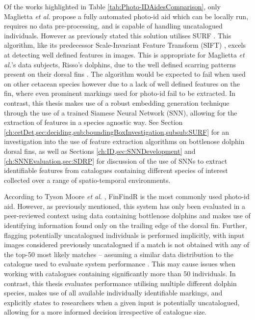 Of the works highlighted in Table \ref{tab:Photo-IDAidesComparison}, only Maglietta \textit{et al.} propose a fully automated photo-id aid which can be locally run, requires no data pre-processing, and is capable of handling uncatalogued individuals. However as previously stated this solution utilises SURF \cite{bay_speeded-up_2008}. This algorithm, like its predecessor Scale-Invariant Feature Transform (SIFT) \cite{lowe_object_1999}, excels at detecting well defined features in images. This is appropriate for Maglietta \textit{et al.}'s data subjects, Risso's dolphins, due to the well defined scarring patterns present on their dorsal fins \cite{mariani_analysis_2016}. The algorithm would be expected to fail when used on other cetacean species however due to a lack of well defined features on the fin, where even prominent markings used for photo-id fail to be extracted. In contrast, this thesis makes use of a robust embedding generation technique through the use of a trained Siamese Neural Network (SNN), allowing for the extraction of features in a species agnostic way. See Section \ref{ch:cetDet,sec:deciding,sub:boundingBoxInvestigation,subsub:SURF} for an investigation into the use of feature extraction algorithms on bottlenose dolphin dorsal fins, as well as Sections \ref{ch:ID,sec:SNNDevelopment} and \ref{ch:SNNEvaluation,sec:SDRP} for discussion of the use of SNNs to extract identifiable features from catalogues containing different species of interest collected over a range of spatio-temporal environments. 
 
According to Tyson Moore \textit{et al.} \cite{tyson_moore_rise_2022}, FinFindR is the most commonly used photo-id aid. However, as previously mentioned, this system has only been evaluated in a peer-reviewed context using data containing bottlenose dolphins and makes use of identifying information found only on the trailing edge of the dorsal fin. Further, flagging potentially uncatalogued individuals is performed implicitly, with input images considered previously uncatalogued if a match is not obtained with any of the top-50 most likely matches -- assuming a similar data distribution to the catalogue used to evaluate system performance \cite{thompson_finfindr_2022}. This may cause issues when working with catalogues containing significantly more than 50 individuals. In contrast, this thesis evaluates performance utilising multiple different dolphin species, makes use of all available individually identifiable markings, and explicitly states to researchers when a given input is potentially uncatalogued, allowing for a more informed decision irrespective of catalogue size.

